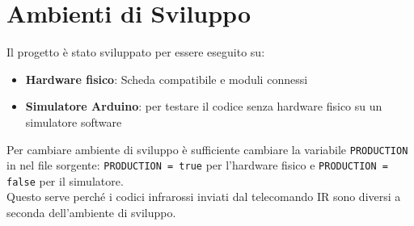 \documentclass[a4paper, 12pt]{article}
\begin{document}
\section{Ambienti di Sviluppo}
Il progetto è stato sviluppato per essere eseguito su:
\begin{itemize}
    \item \textbf{Hardware fisico}: Scheda compatibile e moduli connessi
    \item \textbf{Simulatore Arduino}: per testare il codice senza hardware fisico su un simulatore software
\end{itemize}
Per cambiare ambiente di sviluppo è sufficiente cambiare la variabile \texttt{PRODUCTION} in nel file sorgente: \texttt{PRODUCTION = true} per l'hardware fisico e \texttt{PRODUCTION = false} per il simulatore.\\
Questo serve perché i codici infrarossi inviati dal telecomando IR sono diversi a seconda dell'ambiente di sviluppo.\\
\end{document}
